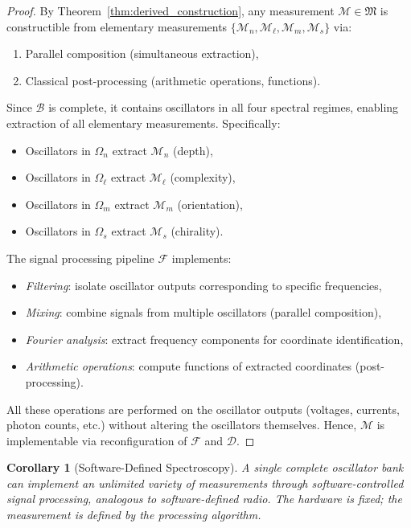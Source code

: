 \documentclass[twocolumn,10pt,a4paper]{article}
\newtheorem{corollary}[theorem]{Corollary}
\theoremstyle{remark}
\begin{document}
\begin{proof}
By Theorem~\ref{thm:derived_construction}, any measurement $\mathcal{M} \in \mathfrak{M}$ is constructible from elementary measurements $\{\mathcal{M}_n, \mathcal{M}_\ell, \mathcal{M}_m, \mathcal{M}_s\}$ via:
\begin{enumerate}[label=(\roman*), noitemsep]
    \item Parallel composition (simultaneous extraction),
    \item Classical post-processing (arithmetic operations, functions).
\end{enumerate}

Since $\mathcal{B}$ is complete, it contains oscillators in all four spectral regimes, enabling extraction of all elementary measurements. Specifically:
\begin{itemize}[noitemsep]
    \item Oscillators in $\Omega_n$ extract $\mathcal{M}_n$ (depth),
    \item Oscillators in $\Omega_\ell$ extract $\mathcal{M}_\ell$ (complexity),
    \item Oscillators in $\Omega_m$ extract $\mathcal{M}_m$ (orientation),
    \item Oscillators in $\Omega_s$ extract $\mathcal{M}_s$ (chirality).
\end{itemize}

The signal processing pipeline $\mathcal{F}$ implements:
\begin{itemize}[noitemsep]
    \item \emph{Filtering}: isolate oscillator outputs corresponding to specific frequencies,
    \item \emph{Mixing}: combine signals from multiple oscillators (parallel composition),
    \item \emph{Fourier analysis}: extract frequency components for coordinate identification,
    \item \emph{Arithmetic operations}: compute functions of extracted coordinates (post-processing).
\end{itemize}

All these operations are performed on the oscillator outputs (voltages, currents, photon counts, etc.) without altering the oscillators themselves. Hence, $\mathcal{M}$ is implementable via reconfiguration of $\mathcal{F}$ and $\mathcal{D}$.
\end{proof}

\begin{corollary}[Software-Defined Spectroscopy]
\label{cor:software_defined}
A single complete oscillator bank can implement an unlimited variety of measurements through software-controlled signal processing, analogous to software-defined radio. The hardware is fixed; the measurement is defined by the processing algorithm.
\end{corollary}
\end{document}
